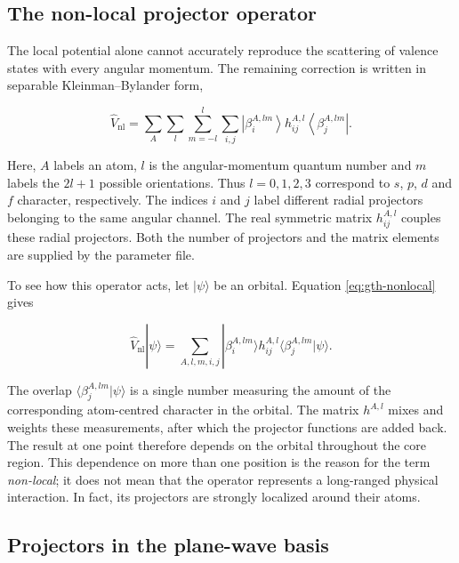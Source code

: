 %
%
%
\subsection{The non-local projector operator}

The local potential alone cannot accurately reproduce the scattering of valence states with every angular momentum. The remaining correction is written in separable Kleinman--Bylander form,

\begin{equation}
    \hat{V}_{\text{nl}}
    = \sum_{A}\sum_{l}\sum_{m=-l}^{l}
      \sum_{i,j}
      \left|\beta_{i}^{A,lm}\right>
      h_{ij}^{A,l}
      \left<\beta_{j}^{A,lm}\right|.
    \label{eq:gth-nonlocal}
\end{equation}

Here, $A$ labels an atom, $l$ is the angular-momentum quantum number and $m$ labels the $2l+1$ possible orientations. Thus $l=0,1,2,3$ correspond to $s$, $p$, $d$ and $f$ character, respectively. The indices $i$ and $j$ label different radial projectors belonging to the same angular channel. The real symmetric matrix $h_{ij}^{A,l}$ couples these radial projectors. Both the number of projectors and the matrix elements are supplied by the parameter file.

To see how this operator acts, let $|\psi\rangle$ be an orbital. Equation \eqref{eq:gth-nonlocal} gives

\begin{equation}
    \hat{V}_{\text{nl}}|\psi\rangle
    = \sum_{A,l,m,i,j}|\beta_{i}^{A,lm}\rangle
      h_{ij}^{A,l}
      \langle\beta_{j}^{A,lm}|\psi\rangle.
    \label{eq:gth-project-action}
\end{equation}

The overlap $\langle\beta_{j}^{A,lm}|\psi\rangle$ is a single number measuring the amount of the corresponding atom-centred character in the orbital. The matrix $h^{A,l}$ mixes and weights these measurements, after which the projector functions are added back. The result at one point therefore depends on the orbital throughout the core region. This dependence on more than one position is the reason for the term \textit{non-local}; it does not mean that the operator represents a long-ranged physical interaction. In fact, its projectors are strongly localized around their atoms.

%
%
%
\subsection{Projectors in the plane-wave basis}

